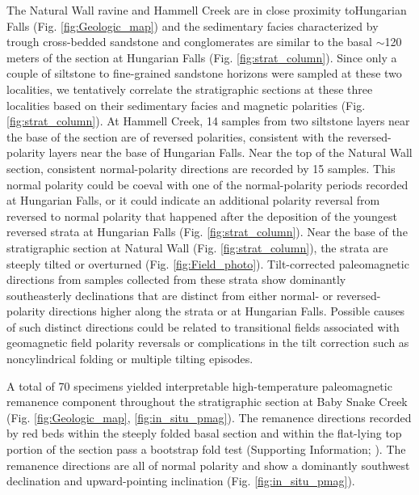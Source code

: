 \documentclass[draft]{agujournal2019}
\begin{document}
The Natural Wall ravine and Hammell Creek are in close proximity toHungarian Falls (Fig. \ref{fig:Geologic_map}) and the sedimentary facies characterized by trough cross-bedded sandstone and conglomerates are similar to the basal $\sim$120 meters of the section at Hungarian Falls (Fig. \ref{fig:strat_column}). Since only a couple of siltstone to fine-grained sandstone horizons were sampled at these two localities, we tentatively correlate the stratigraphic sections at these three localities based on their sedimentary facies and magnetic polarities (Fig. \ref{fig:strat_column}). At Hammell Creek, 14 samples from two siltstone layers near the base of the section are of reversed polarities, consistent with the reversed-polarity layers near the base of Hungarian Falls. Near the top of the Natural Wall section, consistent normal-polarity directions are recorded by 15 samples. This normal polarity could be coeval with one of the normal-polarity periods recorded at Hungarian Falls, or it could indicate an additional polarity reversal from reversed to normal polarity that happened after the deposition of the youngest reversed strata at Hungarian Falls (Fig. \ref{fig:strat_column}). Near the base of the stratigraphic section at Natural Wall (Fig. \ref{fig:strat_column}), the strata are steeply tilted or overturned (Fig. \ref{fig:Field_photo}). Tilt-corrected paleomagnetic directions from samples collected from these strata show dominantly southeasterly declinations that are distinct from either normal- or reversed-polarity directions higher along the strata or at Hungarian Falls. Possible causes of such distinct directions could be related to transitional fields associated with geomagnetic field polarity reversals or complications in the tilt correction such as noncylindrical folding or multiple tilting episodes. 

A total of 70 specimens yielded interpretable high-temperature paleomagnetic remanence component throughout the stratigraphic section at Baby Snake Creek (Fig. \ref{fig:Geologic_map}, \ref{fig:in_situ_pmag}). The remanence directions recorded by red beds within the steeply folded basal section and within the flat-lying top portion of the section pass a bootstrap fold test (Supporting Information; ). The remanence directions are all of normal polarity and show a dominantly southwest declination and upward-pointing inclination (Fig. \ref{fig:in_situ_pmag}). 
\end{document}

